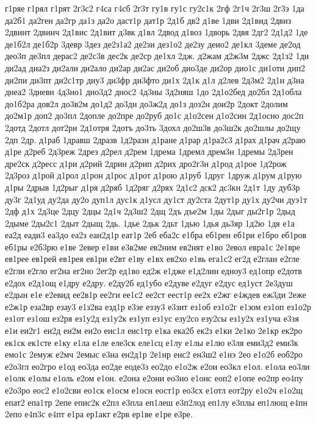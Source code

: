 {г1ряе
г1рял
г1рят
2г3с2
г4са
г4сб
2г3т
гу1в
гу1с
гу2с1к
2гф
2г1ч
2г3ш
2г3э
1да
да2б1
да2ген
да2гр
да1з
да2о
даст1р
дат1р
2д1б
дв2
д1ве
1дви
2д1вид
2двиз
2двинт
2двинч
2д1вис
2д1вит
д3вк
д1вл
2двод
д1воз
1дворь
2двя
2дг2
2д1д2
1де
де1б2л
де1б2р
3девр
3дез
де2з1а2
де2зи
дез1о2
де2зу
деио2
де1кл
3деме
де2од
део3п
де3пл
дерас2
де2с3в
дес2к
де2ср
де1хл
2дж.
д2жам
д2ж3м
2джс
2д1з2
1ди
ди2ад
диа2з
ди2али
ди2ало
ди2ар
ди2ас
ди2об
дио3де
ди2ор
дио1с
ди1оти
дип2
ди2пи
ди3пт
ди2с1тр
диу3
ди3фр
ди3фто
ди1х
2д1к
д1л
д2лев
2д3м2
2д1н
д3на
днеа2
3дневн
4д3но1
дно3д2
днос2
4д3ны
3д2няш
1до
2д1о2бед
до2бл
2д1обла
до1б2ра
дов2л
до3в2м
до1д2
до3дн
до3ж2д
до1з
доз2н
дои2р
2докт
2долим
до2м1р
доп2
до3пл
2допле
до2пре
до2руб
до1с
д1о2сен
д1о2син
2д1осно
дос2п
2дотд
2дотл
дот2ри
2д1отря
2дотъ
до3ть
3дохл
до2ш3в
до3ш2к
до2шлы
до2щу
2дп
2др.
д1раб
1дравш
2дразв
1д2разн
д1ране
д1рар
д1ра2с3
д1рах
д1рач
д2раю
д1ре
д2реб
2д3реж
2дрез
д2рел
д2рем
1дрема
1дремл
дрем3н
1дремы
2д3рен
дре2ск
д2ресс
д1ри
д2рий
2дрин
д2рип
д2рих
дро2г3н
д1род
д1рое
1д2рож
2д3роз
д1рой
д1рол
д1рон
д1рос
д1рот
д1рою
д1руб
1друг
1друж
д1рум
д1рую
д1ры
2дрыв
1д2рыг
д1ря
д2ряб
1д2ряг
д2рях
2д1с2
дск2
дс3кн
2д1т
1ду
дуб3р
ду3г
2д1уд
ду2да
ду2о
дуп1л
дус1к
д1усл
ду1ст
ду2ста
2дут1р
ду1х
ду2чи
дуэ1т
2дф
д1х
2д3це
2дцу
2дцы
2д1ч
2д3ш2
2дщ
2дъ
дъе2м
1ды
2дыг
ды2г1р
2дыд
2дыме
2ды2с1
2дыт
2дыщ
2дь.
1дье
2дьк
2дьт
1дью
1дья
дь3яр
1д2ю
1дя
е1а
еа2д
еади3
еа3до
еа2з
еан2д1р
еат1р
2еб
еба2с
е1бра
еб1рен
еб1ри
е1бро
еб1ров
еб1ры
е2б3рю
е1ве
2евер
е1ви
е3в2ме
ев2ним
ев2нят
е1во
2евол
евра1с
2е1вре
ев1рее
ев1рей
ев1рея
ев1ри
е2вт
е1ву
е1вх
ев2хо
е1вь
ега1с2
ег2д
е2глан
е2гле
е2гли
е2гло
ег2на
ег2но
2ег2р
ед1во
ед2ж
е1дже
е1д2лин
едноу3
ед1опр
е2дотв
е2дох
е2д1ощ
е1дру
е2дру.
е2ду2б
ед1убо
е2дуве
е2дуг
е2дус
ед1уст
2е3душ
е2дын
е1е
е2евид
ее2в1р
ее2ги
ее1с2
ее2ст
еест1р
ее2х
е2жг
е4ждев
еж3ди
2еже
е2ж1р
еза2вр
езау3
е1з2ва
езд1р
е3зе
еззу3
е3зит
ез1об
ез1о2г
е1зом
ез1оп
ез1о2р
ез1от
ез1ош
ез2ря
ез1у2д
ез1у2к
ез1уп
ез1ус
езу2со
езу2сы
ез1у2х
ез1уча
е3зя
е1и
еи2г1
еи2д
еи2м
еи2о
еис1л
еис1тр
е1ка
ека2б
ек2з
е1ки
2е1ко
2е1кр
ек2ро
ек1ск
ек1сте
е1ку
е1ла
е1ле
еле3ск
еле1сц
е1лу
е1лы
е1лю
е3ля
еми3д2
еми3к
емо1с
2емуж
е2мч
2емыс
е3на
ен2д1р
2е1нр
енс2
ен3ш2
е1нэ
2ео
е1о2б
еоб2ро
е2о3гл
ео2гро
е1од
ео3да
ео2де
еоде3з
ео2до
е1о2ж
е2ои
ео3кл
е1ол.
е1ола
ео3ли
е1олк
е1олы
е1оль
е2ом
е1он.
е2она
е2они
ео3но
е1онс
еоп2
е1опе
ео2пр
ео4пу
е2о3ро
еос2
е1о2сви
ео1ск
е1осм
е1осн
еост1р
ео3сх
е1отл
еот2ру
е1о2ч
е1о2щ
епат2
епа1тр
2епе
епис2к
е2пл
е3пла
еп1леш
е3п2лод
еп1лу
е3плы
еп1лющ
е4пн
2епо
е4п3с
е4пт
е1ра
ер1акт
е2рв
ер1ве
е1ре
е3ре.
}

